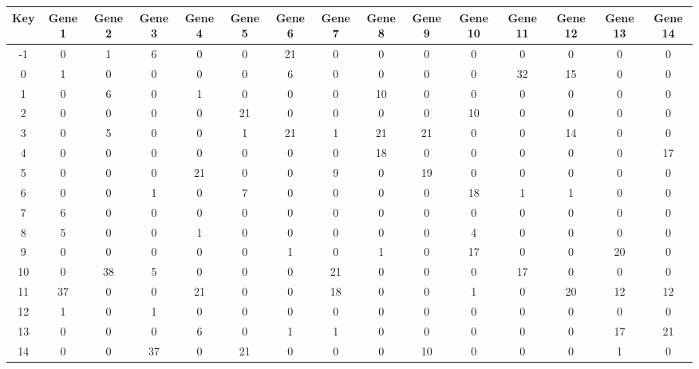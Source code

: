 \begin{tabular}{|c|c|c|c|c|c|c|c|c|c|c|c|c|c|c|}
\hline
Key & Gene 1 & Gene 2 & Gene 3 & Gene 4 & Gene 5 & Gene 6 & Gene 7 & Gene 8 & Gene 9 & Gene 10 & Gene 11 & Gene 12 & Gene 13 & Gene 14 \\
\hline
-1 & 0 & 1 & 6 & 0 & 0 & 21 & 0 & 0 & 0 & 0 & 0 & 0 & 0 & 0 \\
0 & 1 & 0 & 0 & 0 & 0 & 6 & 0 & 0 & 0 & 0 & 32 & 15 & 0 & 0 \\
1 & 0 & 6 & 0 & 1 & 0 & 0 & 0 & 10 & 0 & 0 & 0 & 0 & 0 & 0 \\
2 & 0 & 0 & 0 & 0 & 21 & 0 & 0 & 0 & 0 & 10 & 0 & 0 & 0 & 0 \\
3 & 0 & 5 & 0 & 0 & 1 & 21 & 1 & 21 & 21 & 0 & 0 & 14 & 0 & 0 \\
4 & 0 & 0 & 0 & 0 & 0 & 0 & 0 & 18 & 0 & 0 & 0 & 0 & 0 & 17 \\
5 & 0 & 0 & 0 & 21 & 0 & 0 & 9 & 0 & 19 & 0 & 0 & 0 & 0 & 0 \\
6 & 0 & 0 & 1 & 0 & 7 & 0 & 0 & 0 & 0 & 18 & 1 & 1 & 0 & 0 \\
7 & 6 & 0 & 0 & 0 & 0 & 0 & 0 & 0 & 0 & 0 & 0 & 0 & 0 & 0 \\
8 & 5 & 0 & 0 & 1 & 0 & 0 & 0 & 0 & 0 & 4 & 0 & 0 & 0 & 0 \\
9 & 0 & 0 & 0 & 0 & 0 & 1 & 0 & 1 & 0 & 17 & 0 & 0 & 20 & 0 \\
10 & 0 & 38 & 5 & 0 & 0 & 0 & 21 & 0 & 0 & 0 & 17 & 0 & 0 & 0 \\
11 & 37 & 0 & 0 & 21 & 0 & 0 & 18 & 0 & 0 & 1 & 0 & 20 & 12 & 12 \\
12 & 1 & 0 & 1 & 0 & 0 & 0 & 0 & 0 & 0 & 0 & 0 & 0 & 0 & 0 \\
13 & 0 & 0 & 0 & 6 & 0 & 1 & 1 & 0 & 0 & 0 & 0 & 0 & 17 & 21 \\
14 & 0 & 0 & 37 & 0 & 21 & 0 & 0 & 0 & 10 & 0 & 0 & 0 & 1 & 0 \\
\hline
\end{tabular}